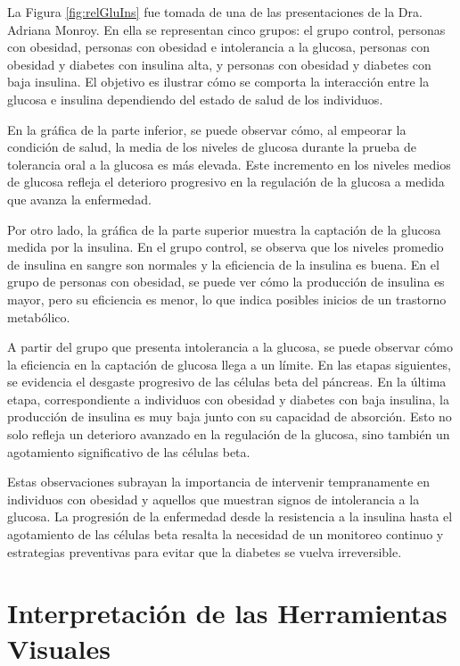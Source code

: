 La Figura \ref{fig:relGluIns} fue tomada de una de las presentaciones de la Dra. Adriana Monroy. En ella se representan cinco grupos: el grupo control, personas con obesidad, personas con obesidad e intolerancia a la glucosa, personas con obesidad y diabetes con insulina alta, y personas con obesidad y diabetes con baja insulina. El objetivo es ilustrar cómo se comporta la interacción entre la glucosa e insulina dependiendo del estado de salud de los individuos.

En la gráfica de la parte inferior, se puede observar cómo, al empeorar la condición de salud, la media de los niveles de glucosa durante la prueba de tolerancia oral a la glucosa es más elevada. Este incremento en los niveles medios de glucosa refleja el deterioro progresivo en la regulación de la glucosa a medida que avanza la enfermedad.

Por otro lado, la gráfica de la parte superior muestra la captación de la glucosa medida por la insulina. En el grupo control, se observa que los niveles promedio de insulina en sangre son normales y la eficiencia de la insulina es buena. En el grupo de personas con obesidad, se puede ver cómo la producción de insulina es mayor, pero su eficiencia es menor, lo que indica posibles inicios de un trastorno metabólico.

A partir del grupo que presenta intolerancia a la glucosa, se puede observar cómo la eficiencia en la captación de glucosa llega a un límite. En las etapas siguientes, se evidencia el desgaste progresivo de las células beta del páncreas. En la última etapa, correspondiente a individuos con obesidad y diabetes con baja insulina, la producción de insulina es muy baja junto con su capacidad de absorción. Esto no solo refleja un deterioro avanzado en la regulación de la glucosa, sino también un agotamiento significativo de las células beta.

Estas observaciones subrayan la importancia de intervenir tempranamente en individuos con obesidad y aquellos que muestran signos de intolerancia a la glucosa. La progresión de la enfermedad desde la resistencia a la insulina hasta el agotamiento de las células beta resalta la necesidad de un monitoreo continuo y estrategias preventivas para evitar que la diabetes se vuelva irreversible.


\section{Interpretación de las Herramientas Visuales}


